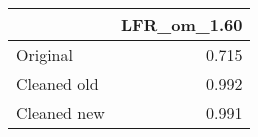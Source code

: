 \begin{tabular}{lr}
\toprule
{} & LFR_om_1.60 \\
\midrule
Original    &       0.715 \\
Cleaned old &       0.992 \\
Cleaned new &       0.991 \\
\bottomrule
\end{tabular}
